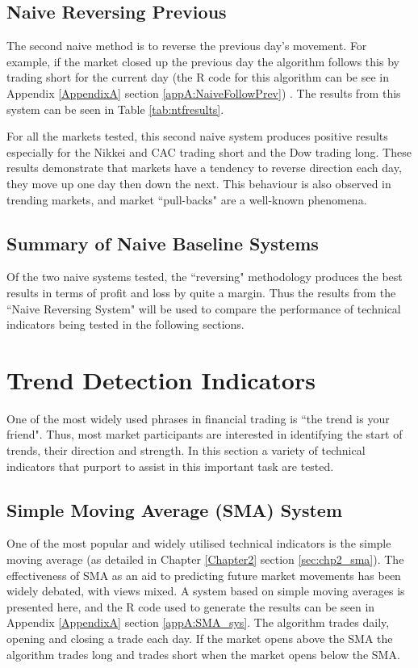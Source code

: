 

\subsection{Naive Reversing Previous}
The second naive method is to reverse the previous day's movement. For example, if the market closed up the previous day the algorithm follows this by trading short for the current day (the R code for this algorithm can be see in Appendix \ref{AppendixA} section \ref{appA:NaiveFollowPrev}) . The results from this system can be seen in Table \ref{tab:ntfresults}.
	\
%


For all the markets tested, this second naive system produces positive results especially for the Nikkei and CAC trading short and the Dow trading long. These results demonstrate that markets have a tendency to reverse direction each day, they move up one day then down the next. This behaviour is also observed in trending markets, and market \textquotedblleft pull-backs" are a well-known phenomena.

\subsection{Summary of Naive Baseline Systems}
Of the two naive systems tested, the \textquotedblleft reversing" methodology produces the best results in terms of profit and loss by quite a margin. Thus the results from the \textquotedblleft Naive Reversing System" will be used to compare the performance of technical indicators being tested in the following sections.

\section{Trend Detection Indicators}
\label{sec:trend}

One of the most widely used phrases in financial trading is \textquotedblleft the trend is your friend". Thus, most market participants are interested in identifying the start of trends, their direction and strength. In this section a variety of technical indicators that purport to assist in this important task are tested. 

\subsection{Simple Moving Average (SMA) System}
\label{sec:Chp4a:sma}
One of the most popular and widely utilised technical indicators is the simple moving average (as detailed in Chapter \ref{Chapter2} section \ref{sec:chp2_sma}). The effectiveness of SMA as an aid to predicting future market movements has been widely debated, with views mixed. A system based on simple moving averages is presented here, and the R code used to generate the results can be seen in Appendix \ref{AppendixA} section \ref{appA:SMA_sys}. The algorithm trades daily, opening and closing a trade each day.  If the market opens above the SMA the algorithm trades long and trades short when the market opens below the SMA.

